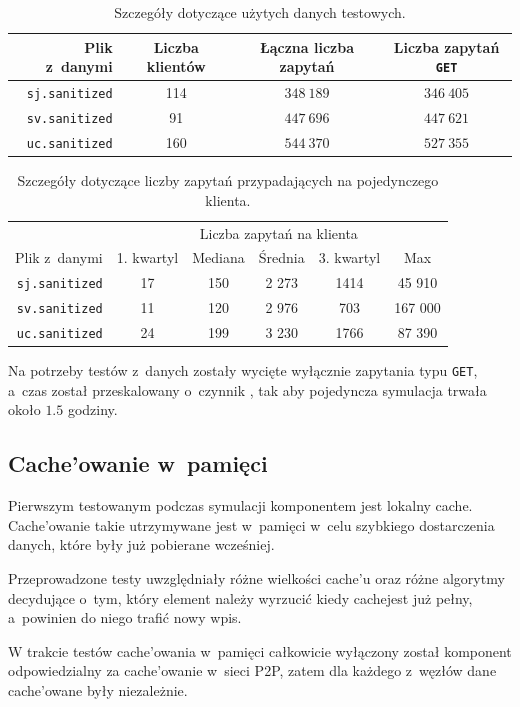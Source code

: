 \documentclass[a4paper,11pt]{scrartcl}
\newcommand{\f}{\texttt}
\newcommand{\s}{ }
\newcommand{\kesz}{cache}
\newcommand{\keszu}{cache'u}
\newcommand{\keszowania}{cache'owania}
\newcommand{\keszowane}{cache'owane}
\newcommand{\keszowanie}{cache'owanie}
\newcommand{\Keszowanie}{Cache'owanie}
\begin{document}
\begin{table}[h!]
\centering
\begin{tabular}{r c c c}
Plik z~danymi & Liczba klientów & Łączna liczba zapytań & Liczba zapytań \f{GET}\\
\hline
\f{sj.sanitized} & 114 & $348~189$ & $346~405$\\
\f{sv.sanitized} & 91 & $447~696$ & $447~621$\\
\f{uc.sanitized} & 160 & $544~370$ & $527~355$\\
\end{tabular}
\caption{Szczegóły dotyczące użytych danych testowych.}
\label{tab_testdata}
\end{table}

\begin{table}[h!]
\centering
\begin{tabular}{r c c c c c}
 & \multicolumn{5}{c}{Liczba zapytań na klienta} \\
Plik z~danymi & 1. kwartyl & Mediana & Średnia & 3. kwartyl & Max \\
\hline
\f{sj.sanitized} & 17 & 150 & 2 273 & 1414 & 45 910  \\
\f{sv.sanitized} & 11 & 120 & 2 976 & 703 & 167 000 \\
\f{uc.sanitized} & 24 & 199 & 3 230 & 1766 & 87 390  \\
\end{tabular}
\caption{Szczegóły dotyczące liczby zapytań przypadających na pojedynczego klienta.}
\label{tab_testdata2}
\end{table}

Na potrzeby testów z~danych zostały wycięte wyłącznie zapytania typu \f{GET}, a~czas został przeskalowany o~czynnik , tak aby pojedyncza symulacja trwała około $1.5$ godziny.

\subsection{\Keszowanie\s w~pamięci}
\label{sect_tests_mem}
Pierwszym testowanym podczas symulacji komponentem jest lokalny \kesz. \Keszowanie\s takie utrzymywane jest w~pamięci w~celu szybkiego dostarczenia danych, które były już pobierane wcześniej.

Przeprowadzone testy uwzględniały różne wielkości \keszu\s oraz różne algorytmy decydujące o~tym, który element należy wyrzucić kiedy \kesz jest już pełny, a~powinien do niego trafić nowy wpis.

W trakcie testów \keszowania\s w~pamięci całkowicie wyłączony został komponent odpowiedzialny za \keszowanie\s w~sieci P2P, zatem dla każdego z~węzłów dane \keszowane\s były niezależnie.
\end{document}
